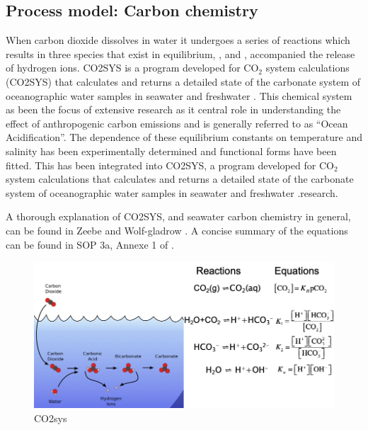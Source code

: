 \documentclass{ruthesis}
\begin{document}
\FloatBarrier
\subsection{Process model: Carbon chemistry}

When carbon dioxide dissolves in water it undergoes a series of reactions which results in three species that exist in equilibrium, ,  and , accompanied  the release of hydrogen ions.   
CO2SYS is a program developed for CO$_2$ system calculations (CO2SYS) that calculates and returns a detailed state of the carbonate system of oceanographic water samples in seawater and freshwater \cite{lewis1998program}. 
This chemical system as been the focus of extensive research as it central role in understanding the effect of anthropogenic carbon emissions and is generally referred to as ``Ocean Acidification''.   
The dependence of these equilibrium constants on temperature and salinity has been experimentally determined and functional forms have been fitted.   
This has been integrated into  CO2SYS, a program developed for CO$_2$ system calculations that calculates and returns a detailed state of the carbonate system of oceanographic water samples in seawater and freshwater \cite{lewis1998program}.research. 

A thorough explanation of CO2SYS, and seawater carbon chemistry in general, can be found in  Zeebe and Wolf-gladrow \cite{zeebe2001co2}.  A concise summary of the equations can be found in SOP 3a, Annexe 1 of \cite{dickson2007guide}. 

\begin{figure}[h] 
	\centerline{\includegraphics[width=1.0\textwidth]{images_microalgae/CO2sys}} 
	\caption[.]{CO2sys} 
	\label{fig:CO2sys} 
\end{figure} 
\end{document}
